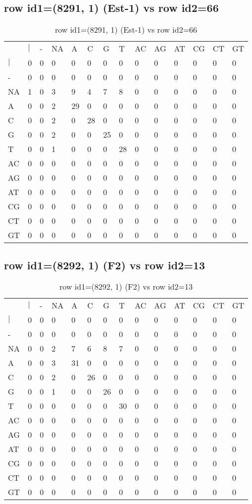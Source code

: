 \subsection{row id1=(8291, 1) (Est-1) vs row id2=66}
\begin{center}
\begin{longtable}{|l|l|l|l|l|l|l|l|l|l|l|l|l|l|}
\caption{row id1=(8291, 1) (Est-1) vs row id2=66} \label{table_dm460}\\
\hline
\\
\hline
&$|$&-&NA&A&C&G&T&AC&AG&AT&CG&CT&GT\\
$|$&0&0&0&0&0&0&0&0&0&0&0&0&0\\
-&0&0&0&0&0&0&0&0&0&0&0&0&0\\
NA&1&0&3&9&4&7&8&0&0&0&0&0&0\\
A&0&0&2&29&0&0&0&0&0&0&0&0&0\\
C&0&0&2&0&28&0&0&0&0&0&0&0&0\\
G&0&0&2&0&0&25&0&0&0&0&0&0&0\\
T&0&0&1&0&0&0&28&0&0&0&0&0&0\\
AC&0&0&0&0&0&0&0&0&0&0&0&0&0\\
AG&0&0&0&0&0&0&0&0&0&0&0&0&0\\
AT&0&0&0&0&0&0&0&0&0&0&0&0&0\\
CG&0&0&0&0&0&0&0&0&0&0&0&0&0\\
CT&0&0&0&0&0&0&0&0&0&0&0&0&0\\
GT&0&0&0&0&0&0&0&0&0&0&0&0&0\\
\hline
\end{longtable}
\end{center}

\subsection{row id1=(8292, 1) (F2) vs row id2=13}
\begin{center}
\begin{longtable}{|l|l|l|l|l|l|l|l|l|l|l|l|l|l|}
\caption{row id1=(8292, 1) (F2) vs row id2=13} \label{table_dm462}\\
\hline
\\
\hline
&$|$&-&NA&A&C&G&T&AC&AG&AT&CG&CT&GT\\
$|$&0&0&0&0&0&0&0&0&0&0&0&0&0\\
-&0&0&0&0&0&0&0&0&0&0&0&0&0\\
NA&0&0&2&7&6&8&7&0&0&0&0&0&0\\
A&0&0&3&31&0&0&0&0&0&0&0&0&0\\
C&0&0&2&0&26&0&0&0&0&0&0&0&0\\
G&0&0&1&0&0&26&0&0&0&0&0&0&0\\
T&0&0&0&0&0&0&30&0&0&0&0&0&0\\
AC&0&0&0&0&0&0&0&0&0&0&0&0&0\\
AG&0&0&0&0&0&0&0&0&0&0&0&0&0\\
AT&0&0&0&0&0&0&0&0&0&0&0&0&0\\
CG&0&0&0&0&0&0&0&0&0&0&0&0&0\\
CT&0&0&0&0&0&0&0&0&0&0&0&0&0\\
GT&0&0&0&0&0&0&0&0&0&0&0&0&0\\
\hline
\end{longtable}
\end{center}

